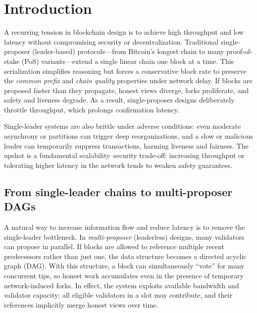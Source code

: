 

\section{Introduction}
\label{sec:intro}

A recurring tension in blockchain design is to achieve high throughput and low latency without compromising security or decentralization. Traditional single-proposer (leader-based) protocols---from Bitcoin's longest chain to many proof-of-stake (PoS) variants---extend a single linear chain one block at a time. This serialization simplifies reasoning but forces a conservative block rate to preserve the \emph{common prefix} and \emph{chain quality} properties under network delay. If blocks are proposed faster than they propagate, honest views diverge, forks proliferate, and safety and liveness degrade. As a result, single-proposer designs deliberately throttle throughput, which prolongs confirmation latency.

Single-leader systems are also brittle under adverse conditions: even moderate asynchrony or partitions can trigger deep reorganizations, and a slow or malicious leader can temporarily suppress transactions, harming liveness and fairness. The upshot is a fundamental scalability--security trade-off: increasing throughput or tolerating higher latency in the network tends to weaken safety guarantees.

\subsection{From single-leader chains to multi-proposer DAGs}
A natural way to increase information flow and reduce latency is to remove the single-leader bottleneck. In \emph{multi-proposer} (leaderless) designs, many validators can propose in parallel. If blocks are allowed to reference multiple recent predecessors rather than just one, the data structure becomes a directed acyclic graph (DAG). With this structure, a block can simultaneously “vote” for many concurrent tips, so honest work accumulates even in the presence of temporary network-induced forks. In effect, the system exploits available bandwidth and validator capacity: all eligible validators in a slot may contribute, and their references implicitly merge honest views over time.

